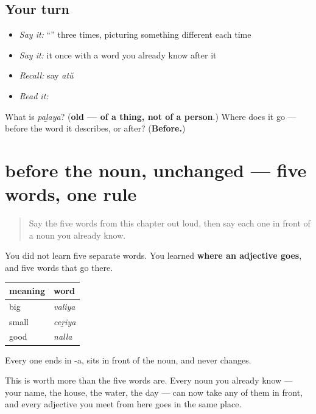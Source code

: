 \subsection*{Your turn}
\begin{itemize}
\raggedright
  \item \emph{Say it:} \textquotedblleft{}\textquotedblright{} three times, picturing something different each time
  \item \emph{Say it:} it once with a word you already know after it
  \item \emph{Recall:} say \emph{atŭ}
  \item \emph{Read it:} \textbf{}
\end{itemize}

\begin{tcolorbox}[breakable,colback=teal!4,colframe=teal!35!black,title={Before you move on}]
What is \emph{paḻaya}? (\textbf{old — of a thing, not of a person}.) Where does it go — before the word it describes, or after? (\textbf{Before.})
\end{tcolorbox}
\section[before the noun, unchanged]{before the noun, unchanged — five words, one rule}

\label{lesson:ML-C42-adjective-system}



\begin{quote}
Say the five words from this chapter out loud, then say each one in front of a noun you already know.
\end{quote}

\begin{grammarlens}[title={Grammar lens: where an adjective goes}]
You did not learn five separate words. You learned \textbf{where an adjective goes}, and five words that go there.

\noindent
\begin{tabularx}{\linewidth}{@{}>{\raggedright\arraybackslash}X>{\raggedright\arraybackslash}X@{}}
\toprule
\textbf{meaning} & \textbf{word} \\
\midrule
big & \textbf{\ml{വലിയ}} \emph{valiya} \\
small & \textbf{\ml{ചെറിയ}} \emph{ceṟiya} \\
good & \textbf{\ml{നല്ല}} \emph{nalla} \\
\bottomrule
\end{tabularx}

Every one ends in -a, sits in front of the noun, and never changes.

This is worth more than the five words are. Every noun you already know — your name, the house, the water, the day — can now take any of them in front, and every adjective you meet from here goes in the same place.
\end{grammarlens}

